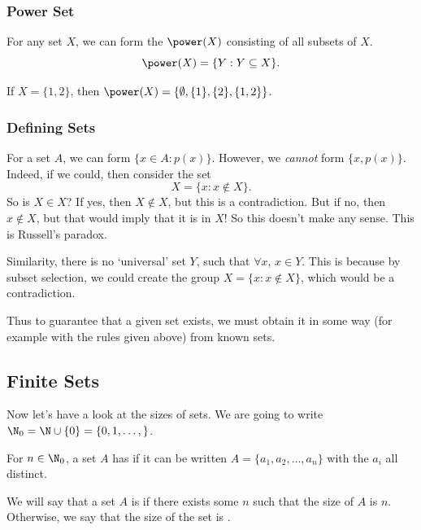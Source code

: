 \documentclass[a4paper]{scrartcl}
\begin{document}
\subsubsection{Power Set}
\vspace{\baselineskip}
\begin{definition}
	For any set $X$, we can form the  $\power(X)$ consisting of all subsets of $X$.
	$$
	\power(X) = \{Y : Y \subseteq X\}.
	$$
\end{definition}

\begin{example}
	If $X = \{1, 2\}$, then $\power(X) = \{\emptyset, \{1\}, \{2\}, \{1, 2\}\}$.
\end{example}


\subsubsection{Defining Sets}

For a set $A$, we can form $\{x \in A : p(x) \}$.
However, we \emph{cannot} form $\{x, p(x)\}$.
Indeed, if we could, then consider the set
$$
X = \{x : x \not\in X\}.
$$
So is $X \in X$? If yes, then $X \not\in X$, but this is a contradiction. But if no, then $x \not \in X$, but that would imply that it is in $X$! So this doesn't make any sense. This is Russell's paradox.

Similarity, there is no `universal' set $Y$, such that $\forall x$, $x \in Y$. This is because by subset selection, we could create the group $X = \{x : x \not\in X\}$, which would be a contradiction.

Thus to guarantee that a given set exists, we must obtain it in some way (for example with the rules given above) from known sets.

\subsection{Finite Sets}

Now let's have a look at the sizes of sets. We are going to write $\N_0 = \N \cup \{0\} = \{0, 1, \dots, \}$.

\begin{definition}[Size]
	For $n \in \N_0$, a set $A$ has  if it can be written $A = \{a_1, a_2, \dots, a_n\}$ with the $a_i$ all distinct.
\end{definition}

\begin{definition}[Finite]
	We will say that a set $A$ is  if there exists some $n$ such that the size of $A$ is $n$. Otherwise, we say that the size of the set is .
\end{definition}
\end{document}
